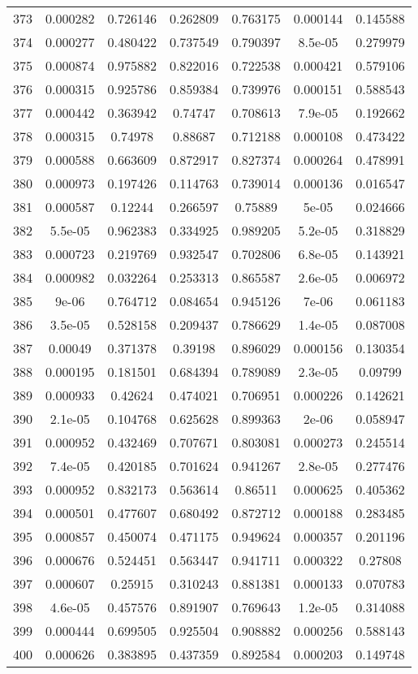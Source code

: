 \begin{table}
\begin{tabular}{c|c|c|c|c|c|c}
373 & 0.000282 & 0.726146 & 0.262809 & 0.763175 & 0.000144 & 0.145588\\
374 & 0.000277 & 0.480422 & 0.737549 & 0.790397 & 8.5e-05 & 0.279979\\
375 & 0.000874 & 0.975882 & 0.822016 & 0.722538 & 0.000421 & 0.579106\\
376 & 0.000315 & 0.925786 & 0.859384 & 0.739976 & 0.000151 & 0.588543\\
377 & 0.000442 & 0.363942 & 0.74747 & 0.708613 & 7.9e-05 & 0.192662\\
378 & 0.000315 & 0.74978 & 0.88687 & 0.712188 & 0.000108 & 0.473422\\
379 & 0.000588 & 0.663609 & 0.872917 & 0.827374 & 0.000264 & 0.478991\\
380 & 0.000973 & 0.197426 & 0.114763 & 0.739014 & 0.000136 & 0.016547\\
381 & 0.000587 & 0.12244 & 0.266597 & 0.75889 & 5e-05 & 0.024666\\
382 & 5.5e-05 & 0.962383 & 0.334925 & 0.989205 & 5.2e-05 & 0.318829\\
383 & 0.000723 & 0.219769 & 0.932547 & 0.702806 & 6.8e-05 & 0.143921\\
384 & 0.000982 & 0.032264 & 0.253313 & 0.865587 & 2.6e-05 & 0.006972\\
385 & 9e-06 & 0.764712 & 0.084654 & 0.945126 & 7e-06 & 0.061183\\
386 & 3.5e-05 & 0.528158 & 0.209437 & 0.786629 & 1.4e-05 & 0.087008\\
387 & 0.00049 & 0.371378 & 0.39198 & 0.896029 & 0.000156 & 0.130354\\
388 & 0.000195 & 0.181501 & 0.684394 & 0.789089 & 2.3e-05 & 0.09799\\
389 & 0.000933 & 0.42624 & 0.474021 & 0.706951 & 0.000226 & 0.142621\\
390 & 2.1e-05 & 0.104768 & 0.625628 & 0.899363 & 2e-06 & 0.058947\\
391 & 0.000952 & 0.432469 & 0.707671 & 0.803081 & 0.000273 & 0.245514\\
392 & 7.4e-05 & 0.420185 & 0.701624 & 0.941267 & 2.8e-05 & 0.277476\\
393 & 0.000952 & 0.832173 & 0.563614 & 0.86511 & 0.000625 & 0.405362\\
394 & 0.000501 & 0.477607 & 0.680492 & 0.872712 & 0.000188 & 0.283485\\
395 & 0.000857 & 0.450074 & 0.471175 & 0.949624 & 0.000357 & 0.201196\\
396 & 0.000676 & 0.524451 & 0.563447 & 0.941711 & 0.000322 & 0.27808\\
397 & 0.000607 & 0.25915 & 0.310243 & 0.881381 & 0.000133 & 0.070783\\
398 & 4.6e-05 & 0.457576 & 0.891907 & 0.769643 & 1.2e-05 & 0.314088\\
399 & 0.000444 & 0.699505 & 0.925504 & 0.908882 & 0.000256 & 0.588143\\
400 & 0.000626 & 0.383895 & 0.437359 & 0.892584 & 0.000203 & 0.149748\\
\end{tabular}
\end{table}
